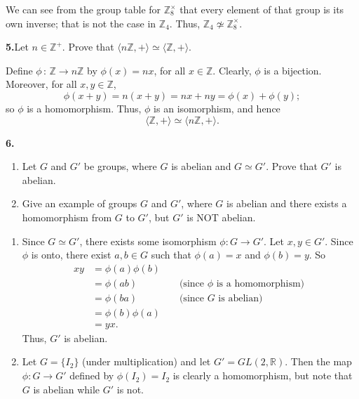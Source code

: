 \documentclass[10pt,]{book}
\theoremstyle{plain}
\theoremstyle{definition}
\theoremstyle{definition}
\theoremstyle{definition}
\theoremstyle{definition}
\numberwithin{equation}{section}
\def\Z{\mathbb{Z}}
\def\R{\mathbb{R}}
\newcommand{\amp}{&}
\begin{document}
We can see from the group table for \(\Z_8^{\times}\) that every element of that group is its own inverse; that is not the case in \(\Z_4\). Thus, \(\Z_4\not\simeq\Z_8^{\times}\).%
\par\smallskip
\noindent\textbf{5.}\quad{}Let \(n\in \Z^+\). Prove that \(\langle n\Z,+\rangle  \simeq \langle \Z,+\rangle\).%
\par\smallskip
Define \(\phi\,:\,\Z \rightarrow n\Z\) by \(\phi(x)=nx\), for all \(x\in \Z\). Clearly, \(\phi\) is a bijection. Moreover, for all \(x,y\in \Z\),%
\begin{equation*}
\phi(x+y)=n(x+y)=nx+ny=\phi(x)+\phi(y);
\end{equation*}
so \(\phi\) is a homomorphism. Thus, \(\phi\) is an isomorphism, and hence%
\begin{equation*}
\langle \Z, +\rangle \simeq \langle n\Z, +\rangle .
\end{equation*}
%
\par\smallskip
\noindent\textbf{6.}\quad{}\leavevmode%
\begin{enumerate}[label=(\alph*)]
\item\hypertarget{li-185}{}Let \(G\) and \(G'\) be groups, where \(G\) is abelian and  \(G\simeq G'\). Prove that \(G'\) is abelian.%
\item\hypertarget{li-186}{}Give an example of groups \(G\) and \(G'\), where \(G\) is abelian and there exists a homomorphism from \(G\) to \(G'\), but \(G'\) is NOT abelian.%
\end{enumerate}
\par\smallskip
\leavevmode%
\begin{enumerate}[label=(\alph*)]
\item\hypertarget{li-187}{}Since \(G\simeq G'\), there exists some isomorphism \(\phi:G\to G'\).  Let \(x,y\in G'\).  Since \(\phi\) is onto, there exist \(a,b\in G\) such that \(\phi(a)=x\) and \(\phi(b)=y\).  So%
\begin{align*}
xy\amp =\phi(a)\phi(b)\amp \amp\\
\amp =\phi(ab)\amp \amp \text{ (since \(\phi\) is a homomorphism) }\\
\amp =\phi(ba) \amp \amp \text{ (since \(G\) is abelian) }\\
\amp =\phi(b)\phi(a)\\
\amp =yx.
\end{align*}
Thus, \(G'\) is abelian.%
\item\hypertarget{li-188}{}Let \(G=\{I_2\}\) (under multiplication) and let \(G'=GL(2,\R)\). Then the map \(\phi: G\to G'\) defined by \(\phi(I_2)=I_2\) is clearly a homomorphism, but note that \(G\) is abelian while \(G'\) is not.%
\end{enumerate}
\end{document}
